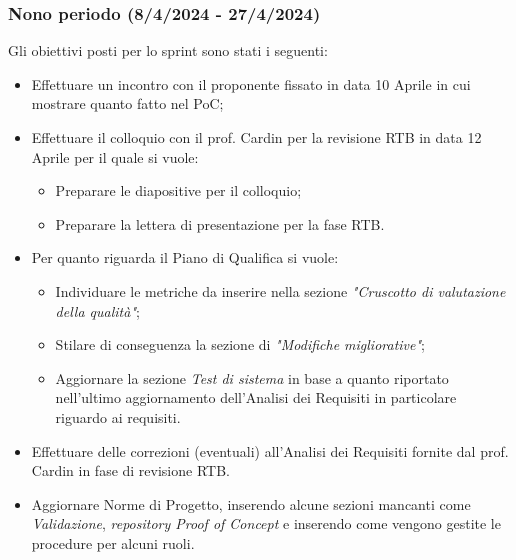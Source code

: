 \subsubsection{Nono periodo (8/4/2024 - 27/4/2024)}
Gli obiettivi posti per lo sprint sono stati i seguenti:
\begin{itemize}
    \item Effettuare un incontro con il proponente fissato in data 10 Aprile in cui mostrare quanto fatto nel PoC;
    \item Effettuare il colloquio con il prof. Cardin per la revisione RTB in data 12 Aprile per il quale si vuole:
    \begin{itemize}
        \item Preparare le diapositive per il colloquio;
        \item Preparare la lettera di presentazione per la fase RTB.
    \end{itemize}
    \item Per quanto riguarda il Piano di Qualifica si vuole:
    \begin{itemize}
        \item Individuare le metriche da inserire nella sezione \emph{"Cruscotto di valutazione della qualità"};
        \item Stilare di conseguenza la sezione di \emph{"Modifiche migliorative"};
        \item Aggiornare la sezione \emph{Test di sistema} in base a quanto riportato nell'ultimo aggiornamento dell'Analisi dei Requisiti in particolare riguardo ai requisiti.
    \end{itemize}
    \item Effettuare delle correzioni (eventuali) all'Analisi dei Requisiti fornite dal prof. Cardin in fase di revisione RTB.
    \item Aggiornare Norme di Progetto, inserendo alcune sezioni mancanti come \emph{Validazione}, \emph{repository Proof of Concept} e inserendo come vengono gestite le procedure per alcuni ruoli.
\end{itemize}
